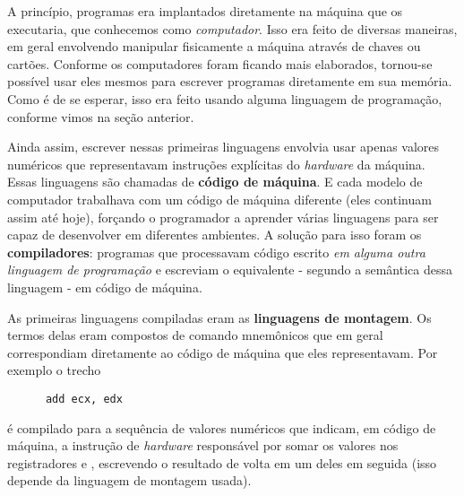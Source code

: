 
    A princípio, programas era implantados diretamente na máquina que os
    executaria, que conhecemos como \emph{computador}. Isso era feito de diversas
    maneiras, em geral envolvendo manipular fisicamente a máquina através de
    chaves ou cartões. Conforme os computadores foram ficando mais elaborados,
    tornou-se possível usar eles mesmos para escrever programas diretamente em
    sua memória. Como é de se esperar, isso era feito usando alguma linguagem
    de programação, conforme vimos na seção anterior.

    Ainda assim, escrever nessas primeiras linguagens envolvia usar apenas valores
    numéricos que representavam instruções explícitas do \emph{hardware} da
    máquina. Essas linguagens são chamadas de \textbf{código de máquina}. E cada
    modelo de computador trabalhava com um código de máquina diferente (eles
    continuam assim até hoje), forçando o programador a aprender várias linguagens
    para ser capaz de desenvolver em diferentes ambientes. A solução para isso
    foram os \textbf{compiladores}: programas que processavam código escrito
    \emph{em alguma outra linguagem de programação} e escreviam o equivalente -
    segundo a semântica dessa linguagem - em código de máquina.


    As primeiras linguagens compiladas eram as \textbf{linguagens de montagem}. Os
    termos delas eram compostos de comando mnemônicos que em geral correspondiam
    diretamente ao código de máquina que eles representavam. Por exemplo o trecho

    \begin{verbatim}
      add ecx, edx\end{verbatim}

    \hspace{-16pt}é compilado para a sequência de valores numéricos que indicam,
    em código de máquina, a instrução de \emph{hardware} responsável por somar os
    valores nos registradores  e , escrevendo o resultado de
    volta em um deles em seguida (isso depende da linguagem de montagem usada).

